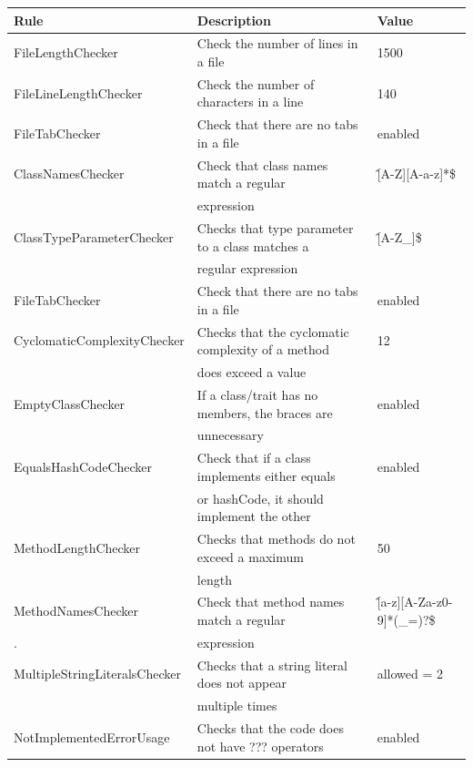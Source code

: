 \documentclass{report}
\begin{document}
\renewcommand{\arraystretch}{1.2}
\begin{center}
\begin{longtable}{|l|l|l|}
\hline
\textbf{Rule} & \textbf{Description} & \textbf{Value}  \\
\hline
FileLengthChecker & \small{Check the number of lines in a file} & 1500  \\
\hline
FileLineLengthChecker & \small{Check the number of characters in a line} & 140 \\
\hline
FileTabChecker & \small{Check that there are no tabs in a file} & enabled \\
\hline
ClassNamesChecker & \small{Check that class names match a regular}  & \^ [A-Z][A-a-z]*\$ \\
& \small{expression} & \\
\hline
\small{ClassTypeParameterChecker} & \small{Checks that type parameter to a class matches a} & \^[A-Z\_]\$ \\
& regular expression & \\
\hline
FileTabChecker & \small{Check that there are no tabs in a file} & enabled \\
\hline
\small{CyclomaticComplexityChecker} & \small{Checks that the cyclomatic complexity of a method} & 12 \\
&  \small{does exceed a value} & \\
\hline
EmptyClassChecker & \small{If a class/trait has no members, the braces are} & enabled \\
&  \small{unnecessary} & \\
\hline
\small{EqualsHashCodeChecker} & \small{Check that if a class implements either equals} & enabled \\ 
 & \small{or hashCode, it should implement the other} & \\
\hline
MethodLengthChecker & \small{Checks that methods do not exceed a maximum} & 50 \\
& \small{length} & \\
\hline
MethodNamesChecker & \small{Check that method names match a regular} & \^[a-z][A-Za-z0-9]*(\_=)?\$ \\
\tiny{.} & \small{expression} & \\
\hline
\small{MultipleStringLiteralsChecker} & \small{Checks that a string literal does not appear} & allowed = 2 \\
& \small{multiple times} & \\
\hline
\small{NotImplementedErrorUsage} & \small{Checks that the code does not have ??? operators} & enabled \\

\end{longtable}
\end{center}
\end{document}

